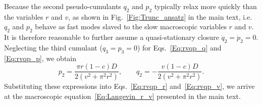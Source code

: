 \documentclass[aps,twocolumn,pre]{revtex4-2}
\begin{document}
Because the second pseudo-cumulants $q_2$ and $p_2$ typically relax more quickly than the variables $r$ and $v$, as shown in Fig.~\ref{Fig:Trunc_ansatz} in the main text, i.e. $q_2$ and $p_2$ behave as fast modes slaved to the slow macroscopic variables $r$ and $v$. It is therefore reasonable to further assume a quasi-stationary closure $\dot{q}_2 = \dot{p}_2 = 0$.
Neglecting the third cumulant ($q_3 = p_3 = 0$) for Eqs.~\eqref{Eq:rvqp_q} and \eqref{Eq:rvqp_p}, we obtain
\begin{equation}
    p_2 = \frac{\pi r (1-c)D}{2(v^2 + \pi^2 r^2)}, 
    \qquad 
    q_2 = -\frac{v (1-c)D}{2(v^2 + \pi^2 r^2)}.
\end{equation}
Substituting these expressions into Eqs.~\eqref{Eq:rvqp_r} and~\eqref{Eq:rvqp_v}, we arrive at the macroscopic equation~\eqref{Eq:Langevin_r_v} presented in the main text. 







\normalem

\end{document}
